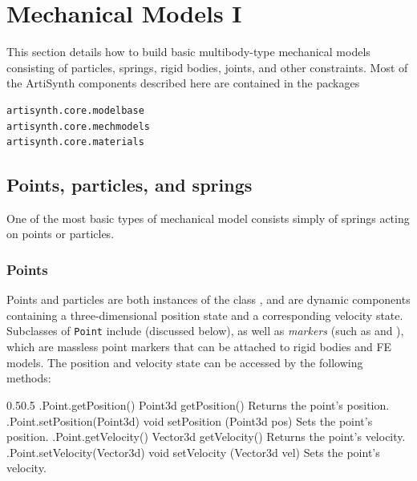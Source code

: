 \ifdefined\maindoc\else
\def\doctitle{Mechanical Models I}

\mainmatter
\fi

\chapter{Mechanical Models I}
\label{MechModelsI:sec}

This section details how to build basic multibody-type mechanical models
consisting of particles, springs, rigid bodies, joints, and other
constraints. Most of the ArtiSynth components described here are
contained in the packages
%
\begin{verbatim}
artisynth.core.modelbase
artisynth.core.mechmodels
artisynth.core.materials
\end{verbatim}
%

\section{Points, particles, and springs}
\label{ParticlesAndSprings:sec}

One of the most basic types of mechanical model consists simply of springs
acting on points or particles.

\subsection{Points}
\label{Points:sec}

Points and particles are both instances of the class
, and are dynamic
components containing a three-dimensional position state and a corresponding
velocity state. Subclasses of {\tt Point} include 
 (discussed below),
as well as {\it markers} (such as
 and ),
which are massless point markers that can be attached to rigid bodies and FE
models. The position and velocity state can be accessed by the following
methods:
%
\begin{methodtable}{0.5}{0.5}
\midline
% 
\methodentry
{\mech.Point.getPosition()}%
{Point3d getPosition()}%
{Returns the point's position.}%
%
\methodentry
{\mech.Point.setPosition(Point3d)}%
{void setPosition (Point3d pos)}%
{Sets the point's position.}%
%
\methodentry
{\mech.Point.getVelocity()}%
{Vector3d getVelocity()}%
{Returns the point's velocity.}%
%
\methodentry
{\mech.Point.setVelocity(Vector3d)}%
{void setVelocity (Vector3d vel)}%
{Sets the point's velocity.}%
%
\midline
\end{methodtable}

